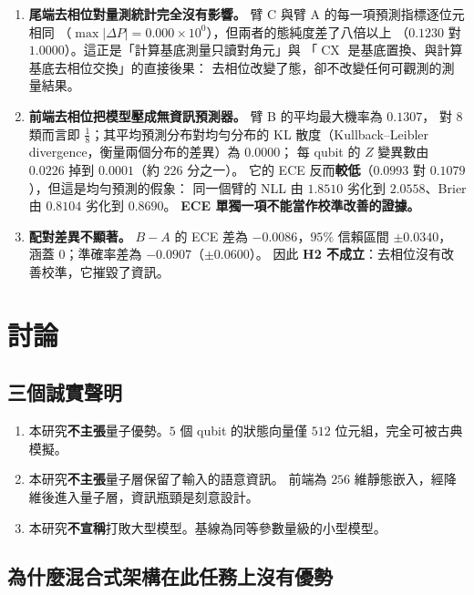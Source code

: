 \documentclass[11pt,a4paper]{ctexart}
\begin{document}
\begin{enumerate}
\item
  \textbf{尾端去相位對量測統計完全沒有影響。} 臂 C 與臂 A
  的每一項預測指標逐位元相同
  （\(\max\left| {\Delta P} \right| = 0.000 \times 10^{0}\)），但兩者的態純度差了八倍以上
  （\(0.1230\) 對 \(1.0000\)）。這正是「計算基底測量只讀對角元」與
  「\(\operatorname{CX}\) 是基底置換、與計算基底去相位交換」的直接後果：
  去相位改變了態，卻不改變任何可觀測的測量結果。
\item
  \textbf{前端去相位把模型壓成無資訊預測器。} 臂 B 的平均最大機率為
  \(0.1307\)， 對 \(8\) 類而言即
  \(\frac{1}{8}\)；其平均預測分布對均勻分布的 KL 散度（Kullback--Leibler
  divergence，衡量兩個分布的差異）為 \(0.0000\)； 每 qubit 的 \(Z\)
  變異數由 \(0.0226\) 掉到 \(0.0001\)（約 \(226\) 分之一）。 它的 ECE
  反而\textbf{較低}（\(0.0993\) 對 \(0.1079\)），但這是均勻預測的假象：
  同一個臂的 NLL 由 \(1.8510\) 劣化到 \(2.0558\)、Brier 由 \(0.8104\)
  劣化到 \(0.8690\)。 \textbf{ECE 單獨一項不能當作校準改善的證據。}
\item
  \textbf{配對差異不顯著。} \(B - A\) 的 ECE 差為 \(- 0.0086\)，\(95\%\)
  信賴區間 \(\pm 0.0340\)， 涵蓋 \(0\)；準確率差為
  \(- 0.0907\)（\(\pm 0.0600\)）。 因此 \textbf{H2
  不成立}：去相位沒有改善校準，它摧毀了資訊。
\end{enumerate}

\section{討論}

\subsection{三個誠實聲明}

\begin{enumerate}
\item
  本研究\textbf{不主張}量子優勢。\(5\) 個 qubit 的狀態向量僅 \(512\)
  位元組，完全可被古典模擬。
\item
  本研究\textbf{不主張}量子層保留了輸入的語意資訊。 前端為 \(256\)
  維靜態嵌入，經降維後進入量子層，資訊瓶頸是刻意設計。
\item
  本研究\textbf{不宣稱}打敗大型模型。基線為同等參數量級的小型模型。
\end{enumerate}

\subsection{為什麼混合式架構在此任務上沒有優勢}
\end{document}

